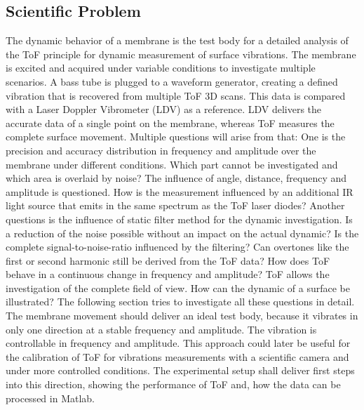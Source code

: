 \subsection{Scientific Problem} 
The dynamic behavior of a membrane is the test body for a detailed analysis of the ToF principle for dynamic measurement of surface vibrations. The membrane is excited and acquired under variable conditions to investigate multiple scenarios. A bass tube is plugged to a waveform generator, creating a defined vibration that is recovered from multiple ToF 3D scans. This data is compared with a Laser Doppler Vibrometer (LDV) as a reference. LDV delivers the accurate data of a single point on the membrane, whereas ToF measures the complete surface movement. Multiple questions will arise from that: One is the precision and accuracy distribution in frequency and amplitude over the membrane under different conditions. Which part cannot be investigated and which area is overlaid by noise? The influence of angle, distance, frequency and amplitude is questioned. How is the measurement influenced by an additional IR light source that emits in the same spectrum as the ToF laser diodes? Another questions is the influence of static filter method for the dynamic investigation. Is a reduction of the noise possible without an impact on the actual dynamic? Is the complete signal-to-noise-ratio influenced by the filtering? Can overtones like the first or second harmonic still be derived from the ToF data? How does ToF behave in a continuous change in frequency and amplitude? ToF allows the investigation of the complete field of view. How can the dynamic of a surface be illustrated? The following section tries to investigate all these questions in detail. The membrane movement should deliver an ideal test body, because it vibrates in only one direction at a stable frequency and amplitude. The vibration is controllable in frequency and amplitude. This approach could later be useful for the calibration of ToF for vibrations measurements with a scientific camera and under more controlled conditions. The experimental setup shall deliver first steps into this direction, showing the performance of ToF and, how the data can be processed in Matlab.   

